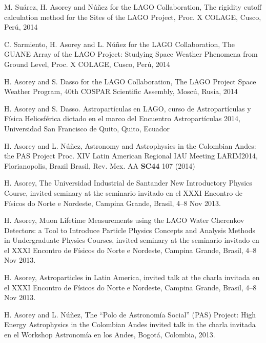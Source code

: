 \begin{etaremune}
\item {}M. Suárez, H. Asorey and Núñez for the LAGO Collaboration, {{The rigidity cutoff calculation method for the Sites of the LAGO Project}}, \en Proc.
X COLAGE, Cusco, Perú, 2014

\item {}C. Sarmiento, H. Asorey and L. Núñez for the LAGO Collaboration, {{The GUANE Array of the LAGO Project: Studying Space Weather Phenomena from Ground Level}}, \en Proc.
X COLAGE, Cusco, Perú, 2014

\item {}H. Asorey and S. Dasso for the LAGO Collaboration, {{The LAGO Project Space Weather Program}}, \en 40th COSPAR Scientific Assembly, Moscú, Rusia, 2014

\item {}H. Asorey and S. Dasso. {{Astropartículas en LAGO}}, curso de Astropartículas y Física Heliosférica dictado en el marco del Encuentro Astropartículas 2014, Universidad San Francisco de Quito, Quito, Ecuador

\item {}H. Asorey and L. Núñez, {{Astronomy and Astrophysics in the Colombian Andes: the PAS Project}} \en Proc.
XIV Latin American Regional IAU Meeting LARIM2014, Florianopolis, \ifeng Brazil \else Brasil\fi, Rev.
Mex.
AA {\textbf{SC44}} 107 (2014)

\item {} H. Asorey, {{The Universidad Industrial de Santander New Introductory Physics Course}}, 
\ifeng
invited seminary at the
\else
seminario invitado en el
\fi
XXXI Encontro de Físicos do Norte e Nordeste, Campina Grande, Brasil, 4--8 Nov 2013.

\item {} H. Asorey, {{Muon Lifetime Measurements using the LAGO Water Cherenkov Detectors: a Tool to Introduce Particle Physics Concepts and Analysis Methods in Undergraduate Physics Courses}}, 
\ifeng
invited seminary at the
\else
seminario invitado en el
\fi
XXXI Encontro de Físicos do Norte e Nordeste, Campina Grande, Brasil, 4--8 Nov 2013.

\item {} H. Asorey, {{Astroparticles in Latin America}}, 
\ifeng
invited talk at the
\else
charla invitada en el 
\fi
XXXI Encontro de Físicos do Norte e Nordeste, Campina Grande, Brasil, 4--8 Nov 2013.

\item {}H. Asorey and L. Núñez, {{The ``Polo de Astronomía Social'' (PAS) Project: High Energy Astrophysics in the Colombian Andes}} \ifeng invited talk in the \else charla invitada en el \fi Workshop Astronomía en los Andes, Bogotá, Colombia, 2013.


\end{etaremune}
